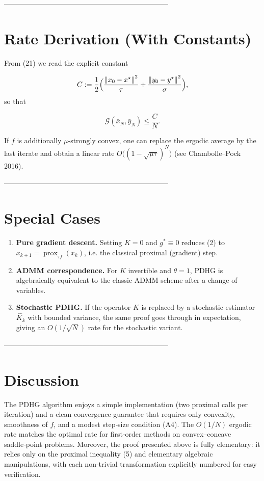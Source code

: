 \documentclass{article}
\newcommand{\norm}[1]{\left\lVert#1\right\rVert}
\begin{document}
---------------------------------------------------------------------

\section*{Rate Derivation (With Constants)}
From (21) we read the explicit constant  

\[
C:=\frac{1}{2}\Bigl(\frac{\norm{x_{0}-x^{\star}}^{2}}{\tau}
                     +\frac{\norm{y_{0}-y^{\star}}^{2}}{\sigma}\Bigr),
\]
so that  

\[
\mathcal G(\bar x_{N},\bar y_{N})\le \frac{C}{N}.
\tag{22}
\]

If $f$ is additionally $\mu$‑strongly convex, one can replace the ergodic average by the last iterate and obtain a linear rate $O\!\bigl((1-\sqrt{\mu\tau})^{N}\bigr)$ (see Chambolle–Pock 2016).  

---------------------------------------------------------------------

\section*{Special Cases}
\begin{enumerate}[label=(\roman*)]
\item \textbf{Pure gradient descent.} Setting $K=0$ and $g^{*}\equiv0$ reduces (2) to $x_{k+1}=\operatorname{prox}_{\tau f}(x_{k})$, i.e. the classical proximal (gradient) step.
\item \textbf{ADMM correspondence.} For $K$ invertible and $\theta=1$, PDHG is algebraically equivalent to the classic ADMM scheme after a change of variables.
\item \textbf{Stochastic PDHG.} If the operator $K$ is replaced by a stochastic estimator $\widehat K_{k}$ with bounded variance, the same proof goes through in expectation, giving an $O(1/\sqrt{N})$ rate for the stochastic variant.
\end{enumerate}

---------------------------------------------------------------------

\section*{Discussion}
The PDHG algorithm enjoys a simple implementation (two proximal calls per iteration) and a clean convergence guarantee that requires only convexity, smoothness of $f$, and a modest step‑size condition (A4). The $O(1/N)$ ergodic rate matches the optimal rate for first‑order methods on convex–concave saddle‑point problems. Moreover, the proof presented above is fully elementary: it relies only on the proximal inequality (5) and elementary algebraic manipulations, with each non‑trivial transformation explicitly numbered for easy verification.
\end{document}
